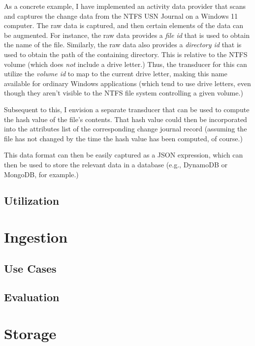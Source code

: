 \documentclass[sigconf,anonymous,review]{acmart}
\begin{document}
As a concrete example, I have implemented an activity data provider that scans
and captures the change data from the NTFS USN Journal on a Windows 11 computer.
The raw data is captured, and then certain elements of the data can be
augmented.  For instance, the raw data provides a \emph{file id} that is used to
obtain the name of the file.  Similarly, the raw data also provides a
\emph{directory id} that is used to obtain the path of the containing directory.
This is relative to the NTFS volume (which does \emph{not} include a drive
letter.)  Thus, the transducer for this can utilize the \emph{volume id} to map
to the current drive letter, making this name available for ordinary Windows
applications (which tend to use drive letters, even though they aren't visible
to the NTFS file system controlling a given volume.)

Subsequent to this, I envision a separate transducer that can be used to compute
the hash value of the file's contents.  That hash value could then be
incorporated into the attributes list of the corresponding change journal record
(assuming the file has not changed by the time the hash value has been computed,
of course.)

This data format can then be easily captured as a JSON expression, which can
then be used to store the relevant data in a database (e.g., DynamoDB or
MongoDB, for example.)

\subsection{Utilization}\label{sec:Architecture:Utilization}

\section{Ingestion}
\label{sec:ingestion}

\subsection{Use Cases}

\subsection{Evaluation}

\section{Storage}
\label{sec:storage}
\end{document}
